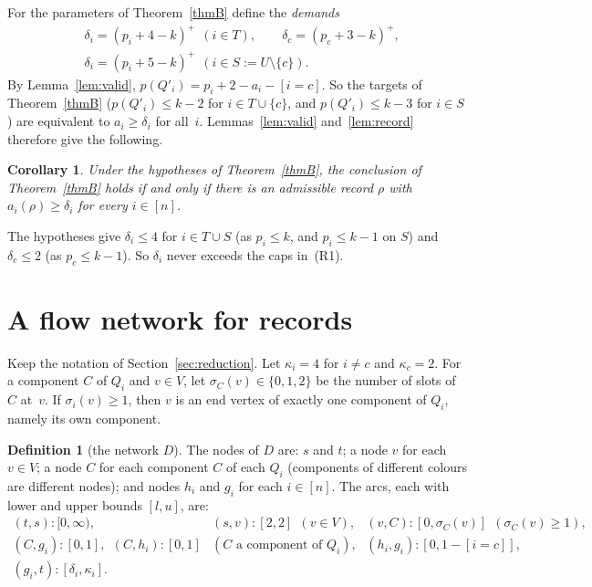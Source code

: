 \documentclass[11pt]{amsart}
\newtheorem{corollary}[theorem]{Corollary}
\theoremstyle{definition}
\newtheorem{definition}[theorem]{Definition}
\theoremstyle{remark}
\newcommand{\pos}[1]{\left(#1\right)^{+}}
\begin{document}
For the parameters of Theorem~\ref{thmB} define the \emph{demands}
\begin{equation}\label{eq:demands}
\begin{aligned}
&\delta_i=\pos{p_i+4-k}\ \ (i\in T),\qquad \delta_c=\pos{p_c+3-k},\\
&\delta_i=\pos{p_i+5-k}\ \ (i\in S:=U\setminus\{c\}).
\end{aligned}
\end{equation}
By Lemma~\ref{lem:valid}, $p(Q'_i)=p_i+2-a_i-[i=c]$. So the targets of Theorem~\ref{thmB}
($p(Q'_i)\le k-2$ for $i\in T\cup\{c\}$, and $p(Q'_i)\le k-3$ for $i\in S$) are equivalent to
$a_i\ge\delta_i$ for all~$i$. Lemmas~\ref{lem:valid} and~\ref{lem:record} therefore give the
following.

\begin{corollary}\label{cor:record}
Under the hypotheses of Theorem~\ref{thmB}, the conclusion of Theorem~\ref{thmB} holds if and
only if there is an admissible record $\rho$ with $a_i(\rho)\ge\delta_i$ for every $i\in[n]$.
\end{corollary}

The hypotheses give $\delta_i\le4$ for $i\in T\cup S$ (as $p_i\le k$, and $p_i\le k-1$ on $S$)
and $\delta_c\le2$ (as $p_c\le k-1$). So $\delta_i$ never exceeds the caps in~(R1).

\section{A flow network for records}\label{sec:flow}

Keep the notation of Section~\ref{sec:reduction}. Let $\kappa_i=4$ for $i\ne c$ and
$\kappa_c=2$. For a component $C$ of $Q_i$ and $v\in V$, let $\sigma_C(v)\in\{0,1,2\}$ be the
number of slots of $C$ at~$v$. If $\sigma_i(v)\ge1$, then $v$ is an end vertex of exactly one
component of $Q_i$, namely its own component.

\begin{definition}[the network $D$]
The nodes of $D$ are: $s$ and $t$; a node $v$ for each $v\in V$; a node $C$ for each component
$C$ of each $Q_i$ (components of different colours are different nodes); and nodes $h_i$ and
$g_i$ for each $i\in[n]$. The arcs, each with lower and upper bounds $[l,u]$, are:
\[
\begin{array}{lll}
(t,s):[0,\infty), & (s,v):[2,2]\ \ (v\in V), & (v,C):[0,\sigma_C(v)]\ \ (\sigma_C(v)\ge1),\\[2pt]
(C,g_i):[0,1],\ \ (C,h_i):[0,1] & (C \text{ a component of } Q_i), & (h_i,g_i):[0,1-[i=c]],\\[2pt]
(g_i,t):[\delta_i,\kappa_i].
\end{array}
\]
\end{definition}
\end{document}
